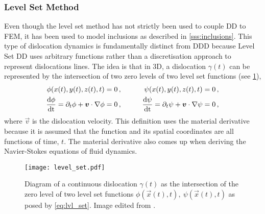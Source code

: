 \subsubsection{Level Set Method}
\label{sss:lvl_set}
%
Even though the level set method has not strictly been used to couple DD to FEM, it has been used to model inclusions \cite{ddd_inclusion_as_force} as described in \cref{sss:inclusions}. This type of dislocation dynamics is fundamentally distinct from DDD because Level Set DD uses arbitrary functions rather than a discretisation approach to represent dislocations lines. The idea is that in 3D, a dislocation $ \gamma(t) $ can be represented by the intersection of two zero levels of two level set functions (see \cref{f:lvl_set_dd}),
\begin{subequations}\label{eq:lvl_set}
	\begin{align}
		\phi(x(t),y(t),z(t),t)                                                          & = 0\,, & \qquad
		\psi(x(t),y(t),z(t),t)                                                          & = 0\,,          \\
		\dfrac{\rvar{d} \phi}{\rvar{dt}} = \partial_{t}\phi + \vec{v} \cdot \nabla \phi & = 0\,, & \qquad
		\dfrac{\rvar{d} \psi}{\rvar{dt}} = \partial_{t}\psi + \vec{v} \cdot \nabla \psi & = 0\,,
	\end{align}
\end{subequations}
where $ \vec{v} $ is the dislocation velocity. This definition uses the material derivative because it is assumed that the function and its spatial coordinates are all functions of time, $ t $. The material derivative also comes up when deriving the Navier-Stokes equations of fluid dynamics.
\begin{figure}[t]
	\centering
	\texttt{[image: level\_set.pdf]}
	\caption[Level set Dislocation Dynamics.]{Diagram of a continuous dislocation $ \gamma(t) $ as the intersection of the zero level of two level set functions $ \phi(\vec{x}(t),t),~\psi(\vec{x}(t),t) $ as posed by \cref{eq:lvl_set}. Image edited from \cite{lvl_set_dd}.}
	\label{f:lvl_set_dd}
\end{figure}

